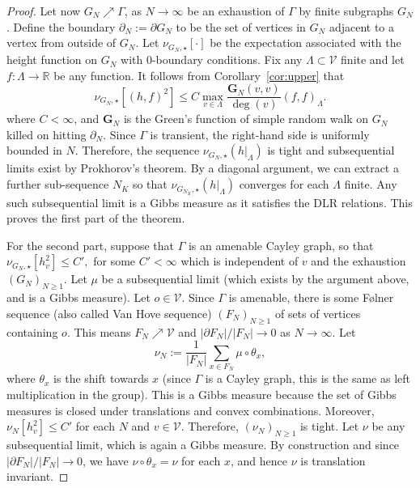 \documentclass[10pt,a4paper]{amsart}
\newcommand{\E}{\nu}
\newcommand{\Green}{\ensuremath{\mathbf{G}}}
\newcommand{\PP}{\nu}
\newcommand{\RR}{\mathbb{R}}
\newcommand{\exact}{\star}
\renewcommand{\c}[1]{\ensuremath{\mathcal{#1}}}
\begin{document}
\begin{proof}
Let now $G_N\nearrow \Gamma$, as $N\to \infty$ be an exhaustion of $\Gamma$ by finite subgraphs $G_N$. 
Define the boundary $\partial_N := \partial G_N$ to be the set of vertices in $ G_N$ adjacent to a vertex from outside of $ G_N$.
Let $\E_{G_N, \exact}[\cdot]$ be the expectation associated with the height function on $ G_N$ with $0$-boundary conditions. 
Fix any $\Lambda \subset \c{V}$ finite and let $f: \Lambda \to \RR$ be any function.
It follows from Corollary~\ref{cor:upper} that 
\[
	\E_{G_N,\exact}[(h, f)^2] \leq C \max_{v \in \Lambda} \frac{\Green_{N} (v,v)}{\deg(v)} (f, f)_{\Lambda}. 
\]
where $C < \infty$, and $\Green_N$ is the Green's function of simple random walk on $G_N$ killed on hitting $\partial_N$. 
Since $\Gamma$ is transient, the right-hand side is uniformly bounded in $N$. 
Therefore, the sequence $\PP_{G_N, \exact}(h |_{\Lambda})$ is tight and subsequential limits exist by Prokhorov's theorem. 
By a diagonal argument, we can extract a further sub-sequence $N_K$ so that $\PP_{G_{N_K}, \exact}(h|_{\Lambda})$ converges for each
$\Lambda$ finite. 
Any such subsequential limit is a Gibbs measure as it satisfies the DLR relations. 
This proves the first part of the theorem. 

For the second part, suppose that $\Gamma$ is an amenable Cayley graph, 
so that 
\(
	\E_{G_N, \exact}[h_v^2] \leq C',
\)
for some $C' < \infty$ which is independent of $v$ and the exhaustion $(G_N)_{N\geq 1}$. 
Let $\mu$ be a subsequential limit (which exists by the argument above, and is a Gibbs measure). 
Let $o \in \mathscr V$. Since $\Gamma$ is amenable, there is some F\o lner sequence (also called Van Hove sequence) $(F_N)_{N \geq 1}$ {of sets of vertices} containing $o$. 
This means $F_N \nearrow \mathscr V$ and $|\partial F_N| / |F_N| \to 0$ as $N \to \infty$. 
Let
\[
	\nu_N := \frac{1}{|F_N|} \sum_{x \in F_N} \mu \circ \theta_x, 
\]
where $\theta_x$ is the shift towards $x$ (since $\Gamma$ is a Cayley graph, this is the same as left multiplication in the group).
This is a Gibbs measure because the set of Gibbs measures is closed under translations and convex combinations. 
Moreover, $\nu_N[h_v^2] \leq C'$ for each $N$ and $v \in \mathscr V$. Therefore, $(\nu_N)_{N\geq 1}$ is tight. 
Let $\nu$ be any subsequential limit, which is again a Gibbs measure. 
By construction and since $|\partial F_N| / |F_N| \to 0$, we have $\nu \circ \theta_x = \nu$ for each $x$, and hence $\nu$ is translation invariant.
\end{proof}
\end{document}
